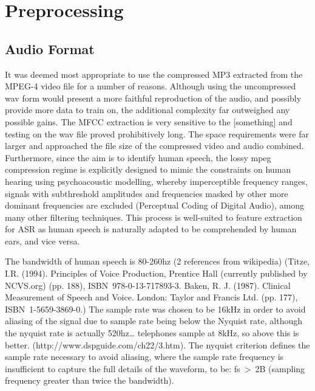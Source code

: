 
\chapter{Preprocessing} %

\label{Chapter2} %


\newcommand{\keyword}[1]{\textbf{#1}}
\newcommand{\tabhead}[1]{\textbf{#1}}
\newcommand{\code}[1]{\texttt{#1}}
\newcommand{\file}[1]{\texttt{\bfseries#1}}
\newcommand{\option}[1]{\texttt{\itshape#1}}


\section{Audio Format}
It was deemed most appropriate to use the compressed MP3 extracted from the MPEG-4 video file for a number of reasons. Although using the uncompressed wav form would present a more faithful reproduction of the audio, and possibly provide more data to train on, the additional complexity far outweighed any possible gains. The MFCC extraction is very sensitive to the [something] and testing on the wav file proved prohibitively long. The space requirements were far larger and approached the file size of the compressed video and audio combined. Furthermore, since the aim is to identify human speech, the lossy mpeg compression regime is explicitly designed to mimic the constraints on human hearing using psychoacoustic modelling, whereby imperceptible frequency ranges, signals with subthreshold amplitudes and frequencies masked by other more dominant frequencies are excluded (Perceptual Coding of Digital Audio), among many other filtering techniques. This process is well-suited to feature extraction for ASR as human speech is naturally adapted to be comprehended by human ears, and vice versa. 

The bandwidth of human speech is 80-260hz (2 references from wikipedia)
(Titze, I.R. (1994). Principles of Voice Production, Prentice Hall (currently published by NCVS.org) (pp. 188), ISBN 978-0-13-717893-3. 
Baken, R. J. (1987). Clinical Measurement of Speech and Voice. London: Taylor and Francis Ltd. (pp. 177), ISBN 1-5659-3869-0.)
The sample rate was chosen to be 16kHz in order to avoid aliasing of the signal due to sample rate being below the Nyquist rate, although the nyquist rate is actually 520hz… telephones sample at 8kHz, so above this is better. (http://www.dspguide.com/ch22/3.htm). The nyquist criterion defines the sample rate necessary to avoid aliasing, where the sample rate frequency is insufficient to capture the full details of the waveform, to be: fs > 2B (sampling frequency greater than twice the bandwidth). 

